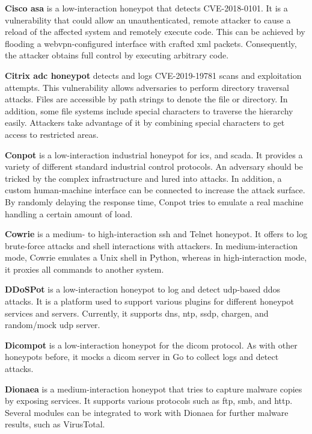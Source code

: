 \textbf{Cisco \ac{asa}} \cite{cymmetria2018} is a low-interaction honeypot that detects CVE-2018-0101\cite{CVE-2018-0101}.
It is a vulnerability that could allow an unauthenticated, remote attacker to cause a reload of the affected system and remotely execute code.
This can be achieved by flooding a webvpn-configured interface with crafted \ac{xml} packets.
Consequently, the attacker obtains full control by executing arbitrary code.

\textbf{Citrix \ac{adc} honeypot} \cite{citrixhoneypot2020} detects and logs CVE-2019-19781\cite{CVE-2019-19781} scans and exploitation attempts.
This vulnerability allows adversaries to perform directory traversal attacks.
Files are accessible by path strings to denote the file or directory.
In addition, some file systems include special characters to traverse the hierarchy easily.
Attackers take advantage of it by combining special characters to get access to restricted areas. \cite{flanders2019}

\textbf{Conpot} \cite{conpot2021} is a low-interaction industrial honeypot for \acf{ics}, and \acf{scada}.
It provides a variety of different standard industrial control protocols.
An adversary should be tricked by the complex infrastructure and lured into attacks.
In addition, a custom human-machine interface can be connected to increase the attack surface.
By randomly delaying the response time, Conpot tries to emulate a real machine handling a certain amount of load.

\textbf{Cowrie} \cite{cowrie2021} is a medium- to high-interaction \ac{ssh} and Telnet honeypot.
It offers to log brute-force attacks and shell interactions with attackers.
In medium-interaction mode, Cowrie emulates a Unix shell in Python, whereas in high-interaction mode, it proxies all commands to another system.

\textbf{DDoSPot} \cite{ddosspot2021} is a low-interaction honeypot to log and detect \ac{udp}-based \ac{ddos} attacks.
It is a platform used to support various plugins for different honeypot services and servers.
Currently, it supports \ac{dns}, \ac{ntp}, \ac{ssdp}, \ac{chargen}, and random/mock \ac{udp} server.

\textbf{Dicompot} \cite{dicompot2021} is a low-interaction honeypot for the \ac{dicom} protocol.
As with other honeypots before, it mocks a \ac{dicom} server in Go to collect logs and detect attacks.

\textbf{Dionaea} \cite{dionaea2021} is a medium-interaction honeypot that tries to capture malware copies by exposing services.
It supports various protocols such as \ac{ftp}, \ac{smb}, and \ac{http}.
Several modules can be integrated to work with Dionaea for further malware results, such as VirusTotal.

